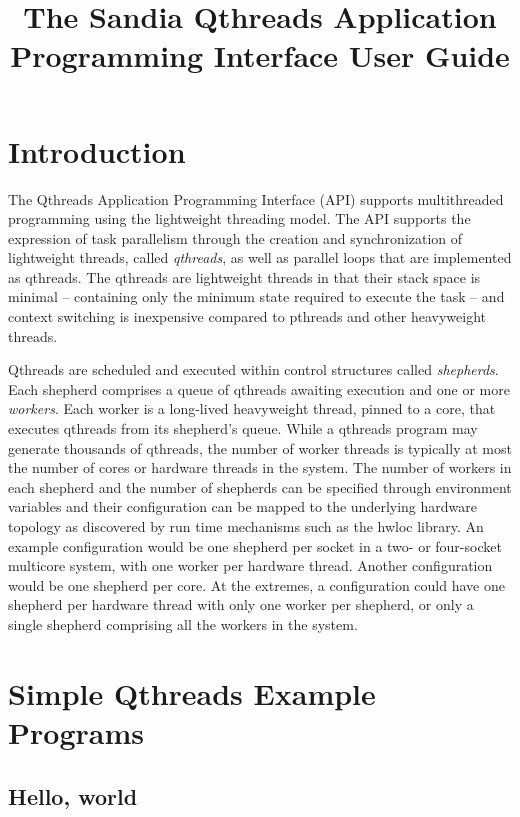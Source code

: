 \documentclass[12pt]{article}
\title{The Sandia Qthreads Application Programming Interface User Guide}
\begin{document}
\lstset{language=C,basicstyle=\ttfamily\footnotesize,frame=single}
\maketitle

\section{Introduction}
The Qthreads Application Programming Interface (API) supports multithreaded programming using the lightweight threading model.  The API supports the expression of task parallelism through the creation and synchronization of lightweight threads, called {\it qthreads}, as well as parallel loops that are implemented as qthreads.  The qthreads are lightweight threads in that their stack space is minimal -- containing only the minimum state required to execute the task -- and context switching is inexpensive compared to pthreads and other heavyweight threads.

Qthreads are scheduled and executed within control structures called {\it shepherds}.  Each shepherd comprises a queue of qthreads awaiting execution and one or more {\it workers}.  Each worker is a long-lived heavyweight thread, pinned to a core, that executes qthreads from its shepherd's queue.  While a qthreads program may generate thousands of qthreads, the number of worker threads is typically at most the number of cores or hardware threads in the system.  The number of workers in each shepherd and the number of shepherds can be specified through environment variables and their configuration can be mapped to the underlying hardware topology as discovered by run time mechanisms such as the hwloc library.  An example configuration would be one shepherd per socket in a two- or four-socket multicore system, with one worker per hardware thread.  Another configuration would be one shepherd per core.  At the extremes, a configuration could have one shepherd per hardware thread with only one worker per shepherd, or only a single shepherd comprising all the workers in the system.

\section{Simple Qthreads Example Programs}

\subsection{Hello, world}
\end{document}
